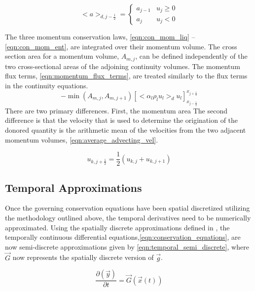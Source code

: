 \begin{equation}
\label{eqn:upwind_donoring}
<a>_{d, j-\frac{1}{2}} = \begin{cases} a_{j-1} &  u_j \geq 0 \\ a_{j} & u_j < 0 \end{cases}
\end{equation}

The three momentum conservation laws, \eqref{eqn:con_mom_liq} -- \eqref{eqn:con_mom_ent}, are integrated over their momentum volume.
The cross section area for a momentum volume, $A_{m,j}$, can be defined independently of the two cross-sectional areas of the adjoining continuity volumes.
The momentum flux terms, \eqref{eqn:momentum_flux_terms}, are treated similarly to the flux terms in the continuity equations.
\begin{equation}
\label{eqn:momentum_flux_terms}
-\min\left(A_{m,j}, A_{m,j+1}\right)\left[<\alpha_l \rho_l u_l>_{d} u_l\right]_{x_{j-\frac{1}{2}}}^{x_{j+\frac{1}{2}}}
\end{equation}
There are two primary differences.
First, the momentum area 
The second difference is that the velocity that is used to determine the origination of the donored quantity is the arithmetic mean of the velocities from the two adjacent momentum volumes, \eqref{eqn:average_advecting_vel}.

\begin{equation}
\label{eqn:average_advecting_vel}
u_{k,j+\frac{1}{2}} = \frac{1}{2}\left(u_{k,j} + u_{k, j+1}\right)
\end{equation}

\subsection{Temporal Approximations}
\label{subsect:temporal_approx}
Once the governing conservation equations have been spatial discretized utilizing the methodology outlined above, the temporal derivatives need to be numerically approximated.
Using the spatially discrete approximations defined in , the temporally continuous differential equations,\eqref{eqn:conservation_equations}, are now semi-discrete approximations given by \eqref{eqn:temporal_semi_discrete}, where $\vec{G}$ now represents the spatially discrete version of $\vec{g}$.

\begin{equation}
\label{eqn:temporal_semi_discrete}
\frac{\partial \left( \vec{y} \right)}{\partial t} = \vec{G}(\vec{x}(t))
\end{equation}

